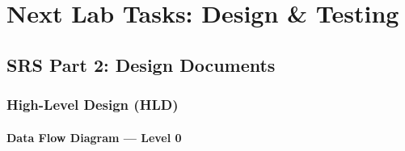 \documentclass[12pt,a4paper]{report}
\begin{document}
\chapter{Next Lab Tasks: Design \& Testing}

\section{SRS Part 2: Design Documents}

\subsection{High-Level Design (HLD)}

\subsubsection{Data Flow Diagram --- Level 0}
\end{document}
